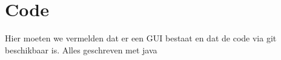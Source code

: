 \documentclass[Main.tex]{subfiles}
\begin{document}
\section{Code}
Hier moeten we vermelden dat er een GUI bestaat en dat de code via git beschikbaar is.
Alles geschreven met java
\end{document}
